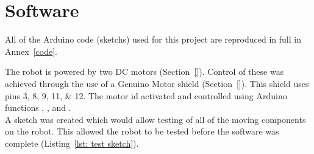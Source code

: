 \chapter{Software}\label{software}\label{section \thechapter}
\noindent All of the \gls{Arduino} code (\glspl{sketch}) used for this project are reproduced in full in Annex~\ref{code}.

    \begin{listing}[bth]
        \caption{Code used to test the moving components of the robot. This sketch was written by \AG. (Lines 82--106 from \hyperref[ino:test_routine]{test\_routine.ino})%
        }%
        \label{lst: test sketch}
    \end{listing}
    The robot is powered by two DC motors (Section~\ref{}). Control of these was achieved through the use of a \gls{Genuino} Motor \Gls{shield} (Section~\ref{}). This shield uses pins \numlist{3;8;9;11;12}. The motor id activated and controlled using Arduino functions , , and .\\
    A \gls{sketch} was created which would allow testing of all of the moving components on the robot. This allowed the robot to be tested before the software was complete (Listing~\ref{lst: test sketch}).
